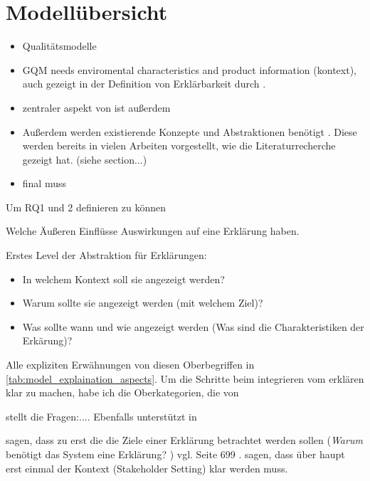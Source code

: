 \section{Modellübersicht}

\begin{itemize}
    \item Qualitätsmodelle \cite{schneider2012abenteuer}
    \item GQM \cite{briand1995goal, schneider2012abenteuer} needs enviromental characteristics and product information (kontext), auch gezeigt in der Definition von Erklärbarkeit durch \cite{chazette_knowledge_nodate}.
    \item zentraler aspekt von \cite{briand1995goal} ist außerdem 
    \item Außerdem werden existierende Konzepte und Abstraktionen benötigt \cite{briand1995goal}. Diese werden bereits in vielen Arbeiten vorgestellt, wie die Literaturrecherche gezeigt hat. (siehe section...)
    \item final muss 
\end{itemize}

Um RQ1 und 2 definieren zu können

Welche Äußeren Einflüsse Auswirkungen auf eine Erklärung haben.

Erstes Level der Abstraktion für Erklärungen:

\begin{itemize}
    \item In welchem Kontext soll sie angezeigt werden? \cite{kohl_explainability_2019, chazette_knowledge_nodate}
    \item Warum sollte sie angezeigt werden (mit welchem Ziel)? \cite{kohl_explainability_2019, rosenfeld_explainability_2019}
    \item Was sollte wann und wie angezeigt werden (Was sind die Charakteristiken der Erkärung)? \cite{kohl_explainability_2019, rosenfeld_explainability_2019}
\end{itemize}

Alle expliziten Erwähnungen von diesen Oberbegriffen in \autoref{tab:model_explaination_aspects}. Um die Schritte beim integrieren vom erklären klar zu machen, habe ich die Oberkategorien, die von 

\cite{rosenfeld_explainability_2019} stellt die Fragen:.... Ebenfalls unterstützt in \cite{chazette2020explainability}

\cite{rosenfeld_explainability_2019} sagen, dass zu erst die die Ziele einer Erklärung betrachtet werden sollen (\glqq \textit{Warum} benötigt das System eine Erklärung? \grqq{}) vgl. Seite 699 \cite{rosenfeld_explainability_2019}. \cite{cirqueira_scenario-based_2020} sagen, dass über haupt erst einmal der Kontext (\glqq Stakeholder Setting\grqq{}) klar werden muss.

